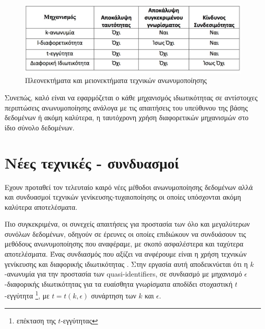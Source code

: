 \begin{figure} [h!]
\begin{center}
  \includegraphics[scale=0.31]{images/mhx.jpg}
  \caption{Πλεονεκτήματα και μειονεκτήματα τεχνικών ανωνυμοποίησης}
  \end{center}
\end{figure}


Συνεπώς, καλό είναι να εφαρμόζεται ο κάθε μηχανισμός ιδιωτικότητας σε αντίστοιχες περιπτώσεις ανωνυμοποίησης ανάλογα με τις απαιτήσεις του υπεύθυνου της βάσης δεδομένων ή ακόμη καλύτερα, η ταυτόχρονη χρήση διαφορετικών μηχανισμών στο ίδιο σύνολο δεδομένων. 






\section {Νέες τεχνικές - συνδυασμοί}

Εχουν προταθεί τον τελευταίο καιρό νέες μέθοδοι ανωνυμοποίησης δεδομένων αλλά και συνδυασμοί τεχνικών γενίκευσης-τυχαιοποίησης οι οποίες υπόσχονται ακόμη καλύτερα αποτελέσματα.

Πιο συγκεκριμένα, οι συνεχείς απαιτήσεις για προστασία των όλο και μεγαλύτερων συνόλων δεδομένων, οδηγούν σε έρευνες οι οποίες επιδιώκουν να συνδυάσουν τις μεθόδους ανωνυμοποίησης που αναφέραμε, με σκοπό ασφαλέστερα και ταχύτερα αποτελέσματα. Ένας συνδιασμός που αξίζει να ανφέρουμε είναι η χρήση τεχνικών γενίκευσης και διαφορικής ιδιωτικότητας \textlatin{\cite{DBLP:journals/corr/Domingo-FerrerS15a}}.
Στην εργασία αυτή αποδεικνύεται ότι η $k$-ανωνυμία για την προστασία των \textlatin{quasi-identifiers}, σε συνδιασμό με μηχανισμό $\epsilon$-διαφορικής ιδιωτικότητας για τα ευαίσθητα γνωρίσματα αποδίδει στοχαστική $t$-εγγύτητα \footnote{επέκταση της $t$-εγγύτητας}, με $t=t(k,\epsilon)$ συνάρτηση των $k$ και $\epsilon$. 


